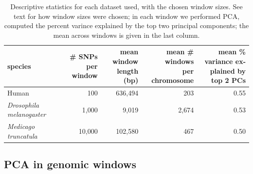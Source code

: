 \documentclass[11pt, oneside]{article}   	%
\begin{document}
\begin{table}[ht]
\centering
    \begin{tabular}{p{0.8in}rrrr}
  \hline
    species 
    & \parbox[t]{.8in}{\# SNPs per \\ window} 
    & \parbox[t]{1in}{mean window\\ length (bp)}
    & \parbox[t]{1.2in}{mean \# windows \\ per chromosome} 
    & \parbox[t]{1.4in}{mean \% variance ex-\\plained by top 2 PCs} \\ 
  \hline
  Human & 100 & 636,494 & 203 & 0.55 \\ 
  \textit{Drosophila melanogaster} & 1,000 & 9,019 & 2,674 & 0.53 \\ 
  \textit{Medicago truncatula} & 10,000 & 102,580 & 467 & 0.50 \\ 
   \hline
\end{tabular}
\caption{
    Descriptive statistics for each dataset used,
    with the chosen window sizes.
    See text for how window sizes were chosen;
    in each window we performed PCA,
    computed the percent varince explained by the top two principal components;
    the mean across windows is given in the last column.
    \label{tab:data_stats}
}
\end{table}


\subsection{PCA in genomic windows}
\end{document}
